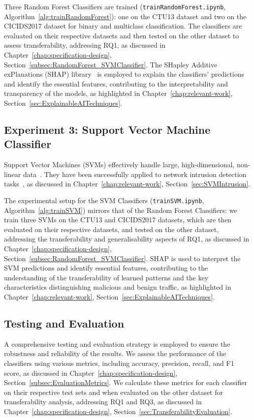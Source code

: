 Three Random Forest Classifiers are trained (\texttt{trainRandomForest.ipynb}, Algorithm~\ref{alg:trainRandomForest}): one on the CTU13 dataset and two on the CICIDS2017 dataset for binary and multiclass classification. The classifiers are evaluated on their respective datasets and then tested on the other dataset to assess transferability, addressing RQ1, as discussed in Chapter~\ref{chap:specification-design}, Section~\ref{subsec:RandomForest_SVMClassifier}. The SHapley Additive exPlanations (SHAP) library~\cite{lundberg2017unified} is employed to explain the classifiers' predictions and identify the essential features, contributing to the interpretability and transparency of the models, as highlighted in Chapter~\ref{chap:relevant-work}, Section~\ref{sec:ExplainableAITechniques}.

\subsection{Experiment 3: Support Vector Machine Classifier}\label{subsec:support-vector-machine-classifier}
Support Vector Machines (SVMs) effectively handle large, high-dimensional, non-linear data~\cite{cortes1995support, scholkopf2002learning}. They have been successfully applied to network intrusion detection tasks~\cite{kim2003network, teng2017svm}, as discussed in Chapter~\ref{chap:relevant-work}, Section~\ref{sec:SVMIntrusion}.

The experimental setup for the SVM Classifiers (\texttt{trainSVM.ipynb}, Algorithm~\ref{alg:trainSVM}) mirrors that of the Random Forest Classifiers: we train three SVMs on the CTU13 and CICIDS2017 datasets, which are then evaluated on their respective datasets, and tested on the other dataset, addressing the transferability and generalisability aspects of RQ1, as discussed in Chapter~\ref{chap:specification-design}, Section~\ref{subsec:RandomForest_SVMClassifier}. SHAP is used to interpret the SVM predictions and identify essential features, contributing to the understanding of the transferability of learned patterns and the key characteristics distinguishing malicious and benign traffic, as highlighted in Chapter~\ref{chap:relevant-work}, Section~\ref{sec:ExplainableAITechniques}.

\subsection{Testing and Evaluation}\label{subsec:testing-evaluation}
A comprehensive testing and evaluation strategy is employed to ensure the robustness and reliability of the results. We assess the performance of the classifiers using various metrics, including accuracy, precision, recall, and F1 score, as discussed in Chapter~\ref{chap:specification-design}, Section~\ref{subsec:EvaluationMetrics}. We calculate these metrics for each classifier on their respective test sets and when evaluated on the other dataset for transferability analysis, addressing RQ1 and RQ3, as discussed in Chapter~\ref{chap:specification-design}, Section~\ref{sec:TransferabilityEvaluation}.

